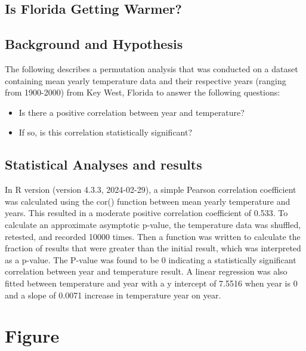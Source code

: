 \documentclass{article}
\begin{document}
\begin{center}
    \section*{Is Florida Getting Warmer?}
\end{center}

\subsection*{Background and Hypothesis}

The following describes a permutation analysis that was conducted on a dataset containing mean yearly temperature data and their respective years (ranging from 1900-2000) from Key West, Florida to answer the following questions:

\begin{itemize}
    \item Is there a positive correlation between year and temperature? 
    \item If so, is this correlation statistically significant? 
\end{itemize}

\subsection*{Statistical Analyses and results}
 In R version (version 4.3.3, 2024-02-29), a simple Pearson correlation coefficient was calculated using the cor() function between mean yearly temperature and years. This resulted in a moderate positive correlation coefficient of 0.533. To calculate an approximate asymptotic p-value, the temperature data was shuffled, retested, and recorded 10000 times. Then a function was written to calculate the fraction of results that were greater than the initial result, which was interpreted as a p-value. The P-value was found to be 0 indicating a statistically significant correlation between year and temperature result. A linear regression was also fitted between temperature and year with a y intercept of 7.5516 when year is 0 and a slope of 0.0071 increase in temperature year on year.  

\section*{Figure}
\centering
\vspace{2em}
\end{document}
